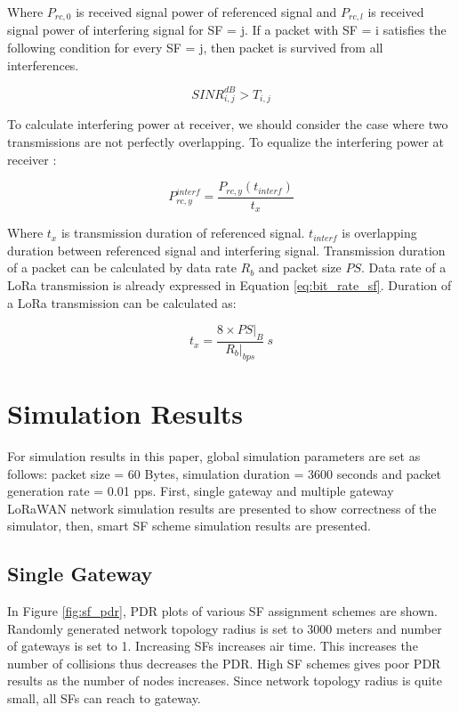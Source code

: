 \documentclass[conference]{IEEEtran}
\begin{document}
Where $P_{rc,0}$ is received signal power of referenced signal and $P_{rc,l}$ is received signal power of interfering signal for SF = j. If a packet with SF = i satisfies the following condition for every SF = j, then packet is survived from all interferences.

\begin{equation} \label{eq:sinr_t}
SINR_{i,j}^{dB} > T_{i,j}
\end{equation}

To calculate interfering power at receiver, we should consider the case where two transmissions are not perfectly overlapping. To equalize the interfering power at receiver \cite{7996384}:

\begin{equation} \label{eq:p_interference}
P_{rc,y}^{interf} = \dfrac{P_{rc,y}(t_{interf})}{t_{x}}
\end{equation}

Where $t_{x}$ is transmission duration of referenced signal. $t_{interf}$ is overlapping duration between referenced signal and interfering signal. Transmission duration of a packet can be calculated by data rate $R_{b}$ and packet size $PS$. Data rate of a LoRa transmission is already expressed in Equation \ref{eq:bit_rate_sf}. Duration of a LoRa transmission can be calculated as:

\begin{equation} \label{eq:transmission_duration}
t_{x} = \dfrac{8 \times PS|_{B}}{R_{b}|_{bps}}  \ s
\end{equation}


\section{Simulation Results} \label{Simulation Results}
For simulation results in this paper, global simulation parameters are set as follows: packet size = 60 Bytes, simulation duration = 3600 seconds and packet generation rate = 0.01 pps. First, single gateway and multiple gateway LoRaWAN network simulation results are presented to show correctness of the simulator, then, smart SF scheme simulation results are presented.

\subsection{Single Gateway}
In Figure \ref{fig:sf_pdr}, PDR plots of various SF assignment schemes are shown. Randomly generated network topology radius is set to 3000 meters and number of gateways is set to 1. Increasing SFs increases air time. This increases the number of collisions thus decreases the PDR. High SF schemes gives poor PDR results as the number of nodes increases. Since network topology radius is quite small, all SFs can reach to gateway.
\end{document}
